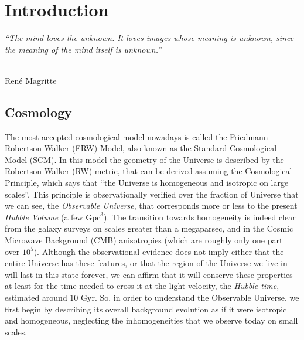 \chapter{Introduction}\label{chp:chp1}

\begin{flushright}
  {\em ``The mind loves the unknown. It loves images whose meaning is unknown, since the meaning of the mind itself is unknown.''}\\

\ \

\normalsize
{Ren\'e Magritte}
\end{flushright}



\section{Cosmology}\label{sec:cosmology}

The most accepted cosmological model nowadays is called the Friedmann-Robertson-Walker (FRW) Model, also known as the Standard Cosmological Model (SCM). In this model the geometry of the Universe is described by the Robertson-Walker (RW) metric, that can be derived assuming the Cosmological Principle, which says that ``the Universe is homogeneous and isotropic on large scales''. This principle is observationally verified over the fraction of Universe that we can see, the \emph{Observable Universe},  that corresponds more or less to the present \emph{Hubble Volume} (a few $\textrm{Gpc}^3$). The transition towards homogeneity is indeed clear from the galaxy surveys on scales greater than a megaparsec, and in the Cosmic Microwave Background (CMB) anisotropies (which are roughly only one part over $10^5$).
Although the observational evidence does not imply either that the entire Universe has these features, or that the region of the Universe we live in will last in this state forever, we can affirm that it will conserve these properties at least for the time needed to cross it at the light velocity, the \emph{Hubble time}, estimated around $10$ Gyr. So, in order to understand the Observable Universe, we first begin by describing its overall background evolution as if it were isotropic and homogeneous, neglecting the inhomogeneities that we observe today on small scales.\\

